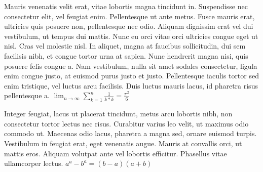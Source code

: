 \documentclass{article}
\begin{document}
Mauris venenatis velit erat, vitae lobortis magna tincidunt in. Suspendisse nec consectetur elit, vel feugiat enim. Pellentesque ut ante metus. Fusce mauris erat, ultricies quis posuere non, pellentesque nec odio. Aliquam dignissim erat vel dui vestibulum, ut tempus dui mattis. Nunc eu orci vitae orci ultricies congue eget ut nisl. Cras vel molestie nisl. In aliquet, magna at faucibus sollicitudin, dui sem facilisis nibh, et congue tortor urna at sapien.
Nunc hendrerit magna nisi, quis posuere felis congue a. Nam vestibulum, nulla sit amet sodales consectetur, ligula enim congue justo, at euismod purus justo et justo. Pellentesque iaculis tortor sed enim tristique, vel luctus arcu facilisis. Duis luctus mauris lacus, id pharetra risus pellentesque a.
$\lim_{n \to \infty}
\sum_{k=1}^n \frac{1}{k*k}
= \frac{\pi^2}{6}$

 Integer feugiat, lacus ut placerat tincidunt, metus arcu lobortis nibh, non consectetur tortor lectus nec risus. Curabitur varius leo velit, ut maximus odio commodo ut. Maecenas odio lacus, pharetra a magna sed, ornare euismod turpis. Vestibulum in feugiat erat, eget venenatis augue. Mauris at convallis orci, ut mattis eros. Aliquam volutpat ante vel lobortis efficitur. Phasellus vitae ullamcorper lectus.
\begin{math}
    a^{a}-b^{a} = (b - a)(a + b)
\end{math}
\end{document}
